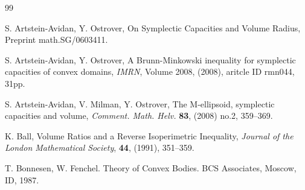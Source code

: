 \documentclass[12pt]{amsart}
\theoremstyle{definition}
\begin{document}
\begin{thebibliography} {99}




 S. Artstein-Avidan, Y. Ostrover, On Symplectic Capacities and Volume Radius, Preprint  math.SG/0603411. 

 S. Artstein-Avidan, Y. Ostrover, A Brunn-Minkowski inequality for symplectic capacities of convex domains, {\em IMRN}, Volume 2008, (2008), aritcle ID rmn044, 31pp.


 S. Artstein-Avidan, V. Milman, Y. Ostrover, The M-ellipsoid, symplectic capacities and volume, {\em Comment. Math. Helv.} {\bf 83}, (2008) no.2, 359--369.



 K. Ball, Volume Ratios and a Reverse Isoperimetric Inequality, {\em Journal of the London Mathematical Society}, {\bf 44}, (1991), 351--359.




 T. Bonnesen, W. Fenchel. Theory of Convex Bodies. BCS Associates, Moscow, ID, 1987.






\end{thebibliography}
\end{document}
